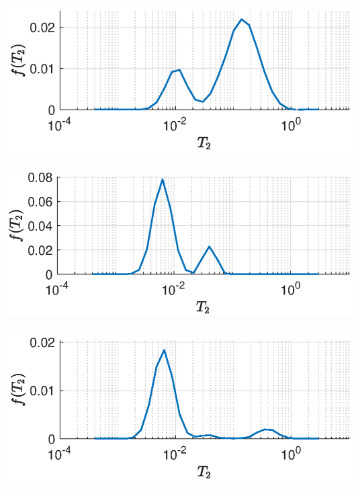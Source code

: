 \begin{figure}[htb!]
    \centering
    \begin{subfigure}[b]{0.49\textwidth}
        \includegraphics[width=\textwidth]{implementation/model1.eps}
        \label{fig:model1True}
    \end{subfigure}
    \begin{subfigure}[b]{0.49\textwidth}
        \includegraphics[width=\textwidth]{implementation/model2.eps}
        \label{fig:model2True}
    \end{subfigure}
    \begin{subfigure}[b]{0.49\textwidth}
        \includegraphics[width=\textwidth]{implementation/model3.eps}
        \label{fig:model3True}
    \end{subfigure}
    \begin{subfigure}[b]{0.49\textwidth}

\end{subfigure}
\end{figure}
